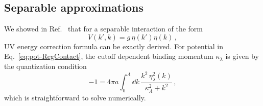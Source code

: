 	\subsection{Separable approximations}
	\label{subsec:Separable_approximation}

	We showed in Ref.~\cite{Konig:2014hma} that for a separable interaction of
	the form
	\begin{equation}
	V(k',k) = g\,\eta(k') \eta(k) \,,
	\label{eq:pot-RegContact}
	\end{equation}
	UV energy correction formula can be exactly derived.  For
	potential in Eq.~\eqref{eq:pot-RegContact}, the cutoff dependent
	binding momentum $\kappa_\lambda$ is given by the quantization condition
	\begin{equation}
	 {-}1 = 4\pi a \int_0^\Lambda\!\dd k\,
	 \frac{k^2\,\eta^2_\lambda(k)}{\kappa^2_\Lambda+k^2} \,,
	\label{eq:quant-sep}
	\end{equation}
	which is straightforward to solve numerically.

